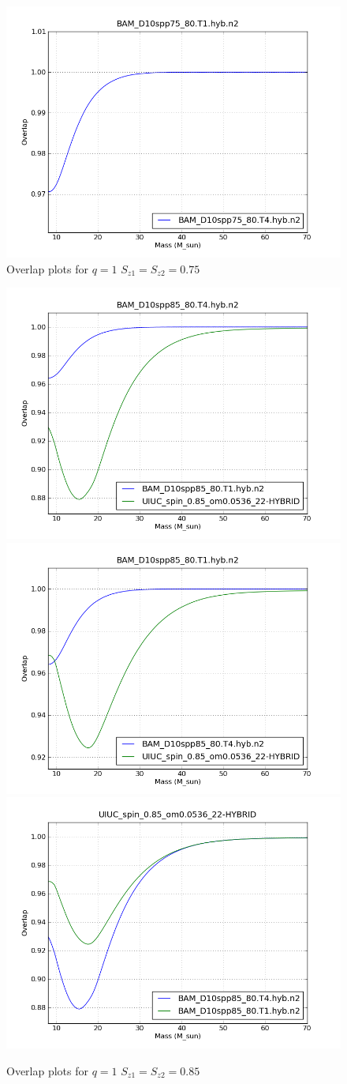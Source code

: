 \begin{figure}
  \includegraphics[width=\linewidth]{figures/ninja2/figure_1_0d75_01.png}
  \caption[Overlap plots for $q=1$ $S_{z1} = S_{z2} = 0.75$]{
  \label{f:figure_1_0d75}
Overlap plots for $q=1$ $S_{z1} = S_{z2} = 0.75$}
\end{figure}%


\begin{figure}
  \includegraphics[width=0.5\linewidth]{figures/ninja2/figure_1_0d85_02.png} 
  \includegraphics[width=0.5\linewidth]{figures/ninja2/figure_1_0d85_04.png} \\
  \includegraphics[width=0.5\linewidth]{figures/ninja2/figure_1_0d85_06.png} 
  \caption[Overlap plots for $q=1$ $S_{z1} = S_{z2} = 0.85$]{
  \label{f:figure_1_0d85}
Overlap plots for $q=1$ $S_{z1} = S_{z2} = 0.85$}
\end{figure}%

\clearpage


